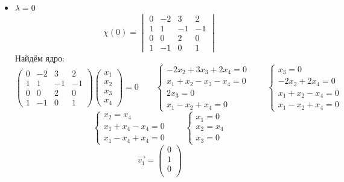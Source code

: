 \begin{itemize}
	\item $ \lambda = 0 $
    $$ \chi(0) =
    \begin{vmatrix}
    	0 & -2 & 3 & 2 \\
        1 & 1 & -1 & -1 \\
        0 & 0 & 2 & 0 \\
        1 & -1 & 0 & 1
    \end{vmatrix} $$
    Найдём ядро:
    $$
    \begin{pmatrix}
    	0 & -2 & 3 & 2 \\
        1 & 1 & -1 & -1 \\
        0 & 0 & 2 & 0 \\
        1 & -1 & 0 & 1
    \end{pmatrix}
    \begin{pmatrix}
    	x_1 \\
        x_2 \\
        x_3 \\
        x_4
    \end{pmatrix} = 0 \qquad
    \begin{cases}
    	-2x_2 + 3x_3 + 2x_4 = 0 \\
        x_1 + x_2 - x_3 - x_4 = 0 \\
        2x_3 = 0 \\
        x_1 - x_2 + x_4 = 0
    \end{cases} \qquad
    \begin{cases}
    	x_3 = 0 \\
        -2x_2 + 2x_4 = 0 \\
        x_1 + x_2 - x_4 = 0 \\
        x_1 - x_2 + x_4 = 0
    \end{cases} $$
    $$
    \begin{cases}
    	x_2 = x_4 \\
        x_1 + x_4 - x_4 = 0 \\
        x_1 - x_4 + x_4 = 0
    \end{cases} \qquad
    \begin{cases}
    	x_1 = 0 \\
        x_2 = x_4 \\
        x_3 = 0
    \end{cases} $$
    $$ \vec{v_1} =
    \begin{pmatrix}
    	0 \\
        1 \\
        0 \\

\end{pmatrix}$$
\end{itemize}
